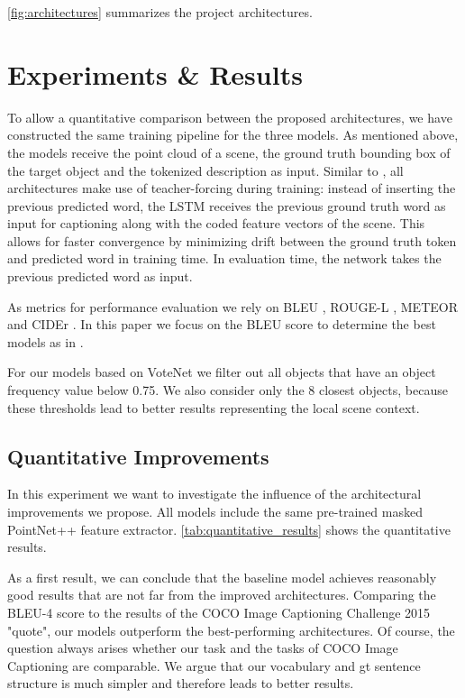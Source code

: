 \documentclass[10pt,twocolumn,letterpaper]{article}
\begin{document}
\autoref{fig:architectures} summarizes the project architectures.

\section{Experiments \& Results}

To allow a quantitative comparison between the proposed architectures, we have constructed the same training pipeline for the three models. As mentioned above, the models receive the point cloud of a scene, the ground truth bounding box of the target object and the tokenized description as input.
Similar to \cite{xu2015show}, all architectures make use of teacher-forcing during training: instead of inserting the previous predicted word, the LSTM receives the previous ground truth word as input for captioning along with the coded feature vectors of the scene.  This allows for faster convergence by minimizing drift between the ground truth token and predicted word in training time. In evaluation time, the network takes the previous predicted word as input. 

As metrics for performance evaluation we rely on BLEU \cite{Papineni2002BleuAM}, ROUGE-L \cite{Lin2004ROUGEAP}, METEOR \cite{Denkowski2014MeteorUL} and CIDEr \cite{DBLP:journals/corr/VedantamZP14a}.  In this paper we focus on the BLEU score to determine the best models as in \cite{xu2015show}. 

For our models based on VoteNet we filter out all objects that have an object frequency value below 0.75. We also consider only the 8 closest objects, because these thresholds lead to better results representing the local scene context.   

\subsection{Quantitative Improvements}
In this experiment we want to investigate the influence of the architectural improvements we propose. All models include the same pre-trained masked PointNet++ feature extractor. 
\autoref{tab:quantitative_results} shows the quantitative results. 

As a first result, we can conclude that the baseline model achieves reasonably good results that are not far from the improved architectures. Comparing the BLEU-4 score to the results of the COCO Image Captioning Challenge 2015 "quote", our models outperform the best-performing architectures. Of course, the question always arises whether our task and the tasks of COCO Image Captioning are comparable. We argue that our vocabulary and gt sentence structure is much simpler and therefore leads to better results.
\end{document}
